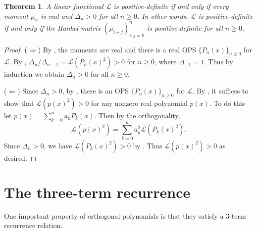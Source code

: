 \documentclass[oneside]{book}
\numberwithin{equation}{section}
\newtheorem{thm}{Theorem}[section]
\theoremstyle{definition}
\newcommand\LL{\mathcal{L}}
\begin{document}
\begin{thm}\label{thm:pos-def-equiv2}
  A linear functional \( \LL \) is positive-definite if and only if
  every moment \( \mu_n \) is real and \( \Delta_n>0 \) for all
  \( n\ge0 \). In other words, \( \LL \) is positive-definite if and
  only if the Hankel matrix \( (\mu_{i+j})_{i,j=0}^n \) is
  positive-definite for all \( n\ge0 \).
\end{thm}
\begin{proof}
  (\(\Rightarrow\)) By , the moments are real
  and there is a real OPS \( \{ P_n(x) \}_{n\ge 0} \) for \( \LL \).
  By , \( \Delta_n/\Delta_{n-1} = \LL(P_n(x)^2)>0 \)
  for \( n\ge0 \), where \( \Delta_{-1}=1 \).
  Thus by induction we obtain \( \Delta_n>0 \) for all \( n\ge0 \).

  (\(\Leftarrow\)) Since \( \Delta_n>0 \), by , there
  is an OPS \( \{ P_n(x) \}_{n\ge 0} \) for \( \LL \). By
  , it suffices to show that
  \( \LL(p(x)^2) > 0 \) for any nonzero real polynomial \( p(x) \). To
  do this let \( p(x) = \sum_{k=0}^n a_k P_k(x) \). Then by the
  orthogonality,
  \[
    \LL(p(x)^2) = \sum_{k=0}^n a_k^2 \LL(P_k(x)^2).
  \]
  Since \( \Delta_n>0 \), we have \( \LL(P_k(x)^2)>0 \) by
  . Thus \( \LL(p(x)^2)>0 \) as desired.
\end{proof}


\section{The three-term recurrence}
\label{sec:three-term-recurr}


One important property of orthogonal polynomials is that they satisfy
a 3-term recurrence relation.
\end{document}
